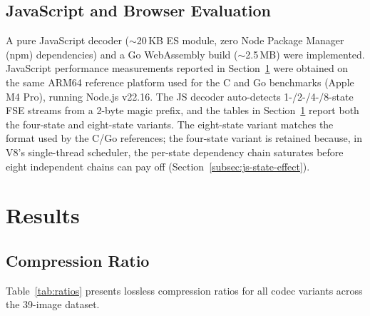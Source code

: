 \documentclass[journal]{IEEEtran}
\begin{document}
\subsection{JavaScript and Browser Evaluation}

A pure JavaScript decoder (${\sim}$20\,KB ES module, zero Node Package Manager
(npm) dependencies) and a Go WebAssembly build (${\sim}$2.5\,MB) were
implemented. JavaScript performance measurements reported in
Section~\ref{sec:results} were obtained on the same ARM64 reference
platform used for the C and Go benchmarks (Apple M4 Pro), running
Node.js v22.16. The JS decoder auto-detects 1-/2-/4-/8-state FSE
streams from a 2-byte magic prefix, and the tables in
Section~\ref{sec:results} report both the four-state and eight-state
variants. The eight-state variant matches the format used by the C/Go
references; the four-state variant is retained because, in V8's
single-thread scheduler, the per-state dependency chain saturates
before eight independent chains can pay off
(Section~\ref{subsec:js-state-effect}).

\section{Results}
\label{sec:results}

\subsection{Compression Ratio}

Table~\ref{tab:ratios} presents lossless compression ratios for all codec
variants across the 39-image dataset.
\end{document}
